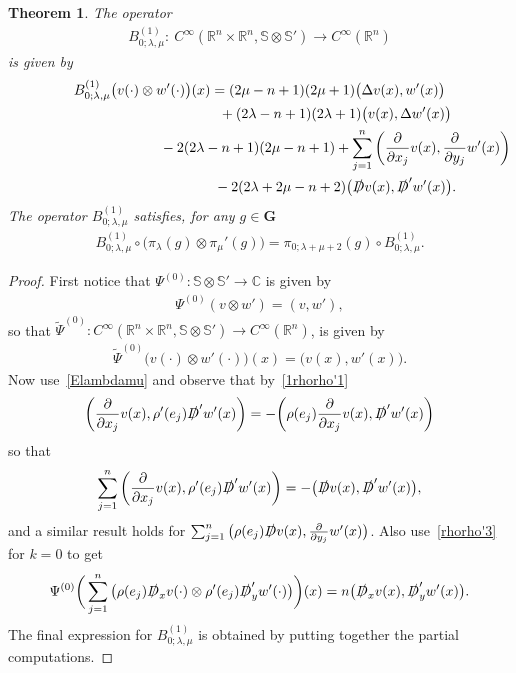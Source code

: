 \documentclass[pdftex]{sigma}
\newcommand{\fsl}[1]{{\slashed{#1}}} %
\numberwithin{equation}{section}
\newtheorem{theor}{Theorem}[section]
\begin{document}
\begin{theor}
The operator
\begin{gather*}
B_{0;\lambda, \mu}^{(1)} \colon\ C^\infty(\mathbb R^n\times \mathbb R^n, \mathbb S\otimes \mathbb S') \to C^\infty(\mathbb R^n)
\end{gather*}
is given by
\begin{gather}
B_{0;\lambda, \mu}^{(1)}\big(v(\cdot)\otimes w'(\cdot)\big)(x) =
(2\mu-n+1) (2\mu+1)\big( \Delta v(x), w'(x)\big) \nonumber
\\ \hphantom{B_{0;\lambda, \mu}^{(1)}\big(v(\cdot)\otimes w'(\cdot)\big)(x) =}
{}+(2\lambda-n+1)(2\lambda+1)\big(v(x), \Delta w'(x)\big)\nonumber
\\ \hphantom{B_{0;\lambda, \mu}^{(1)}\big(v(\cdot)\otimes w'(\cdot)\big)(x) =}
{} -2(2\lambda-n+1)(2\mu-n+1)
 +\sum_{j=1}^n \bigg(\frac{\partial}{\partial x_j}v(x), \frac{\partial}{\partial y_j}w'(x)\bigg)\nonumber
 \\ \hphantom{B_{0;\lambda, \mu}^{(1)}\big(v(\cdot)\otimes w'(\cdot)\big)(x) =}
{}-2(2\lambda+2\mu-n+2)\big( \fsl{D}v(x), \fsl{D}'w'(x)\big).\label{B_0}
\end{gather}
The operator $B_{0;\lambda, \mu}^{(1)}$ satisfies, for any $g\in \mathbf G$
\begin{gather*}
B_{0;\lambda, \mu}^{(1)}\circ \big(\pi_\lambda(g) \otimes \pi_\mu'(g)\big) = \pi_{0;\lambda+\mu+2}(g) \circ B_{0;\lambda, \mu}^{(1)} .
\end{gather*}
\end{theor}
\begin{proof}
First notice that $\Psi^{(0)}\colon \mathbb S \otimes \mathbb S'\to \mathbb C$ is given by
\begin{gather*}
\Psi^{(0)} (v\otimes w') = (v,w'),
\end{gather*}
so that $\widetilde \Psi^{(0)} \colon C^\infty(\mathbb R^n \times \mathbb R^n,\mathbb S\otimes \mathbb S')\to C^\infty(\mathbb R^n)$, is given by
\begin{gather*}
\widetilde \Psi^{(0)}\big(v(\cdot)\otimes w'(\cdot)\big)(x) = \big(v(x),w'(x)\big) .
\end{gather*}
Now use~\eqref{Elambdamu} and observe that by~\eqref{1rhorho'1}
\begin{gather*}
\bigg(\frac{\partial}{\partial x_j} v(x), \rho'(e_j) \fsl{D}'w'(x) \bigg) = -\bigg(\rho(e_j) \frac{\partial}{\partial x_j} v(x), \fsl{D}'w'(x)\bigg)
\end{gather*}
so that
\begin{gather*}
\sum_{j=1}^n \bigg(\frac{\partial}{\partial x_j} v(x), \rho'(e_j) \fsl{D}'w'(x) \bigg) = -\big( \fsl{D} v(x), \fsl{D}'w'(x)\big),
\end{gather*}
and a similar result holds for $\sum_{j=1}^n \big( \rho(e_j) \fsl{D}v(x), \frac{\partial}{\partial y_j} w'(x) \big) $. Also use~\eqref{rhorho'3} for $k=0$ to get
\begin{gather*}
\Psi^{(0)}\bigg(\sum_{j=1}^n \big(\rho(e_j) \fsl{D}_x v(\cdot)\otimes \rho'(e_j) \fsl{D}'_y w'(\cdot) \big)\bigg)(x)=n \big( \fsl{D}_x v(x), \fsl{D}'_y w'(x)\big).
\end{gather*}
The final expression for $B_{0;\lambda,\mu}^{(1)}$ is obtained by putting together the partial computations.
\end{proof}
\end{document}
